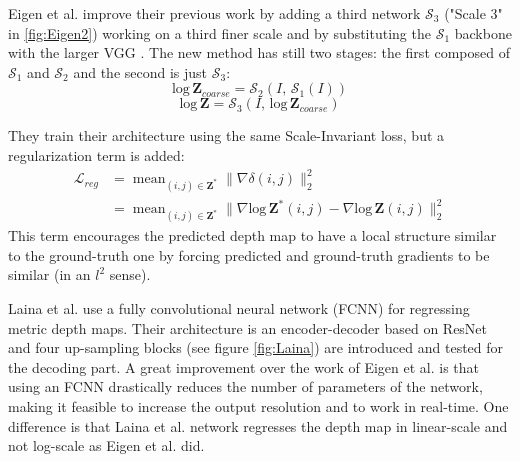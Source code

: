 Eigen et al. \cite{Eigen2} improve their previous work \cite{Eigen} by adding a third network $\mathcal{S}_{3}$ ("Scale 3" in \ref{fig:Eigen2}) working on a third finer scale and by substituting the $\mathcal{S}_{1}$ backbone with the larger VGG \cite{VGG}.
The new method has still two stages: the first composed of $\mathcal{S}_{1}$ and $\mathcal{S}_{2}$ and the second is just $\mathcal{S}_{3}$:
\[
	\text{log} \, \mathbf{Z}_{coarse} = \mathcal{S}_{2}(I, \, \mathcal{S}_{1}(I))
\]\[
	\text{log} \, \mathbf{Z} = \mathcal{S}_{3}(I, \, \text{log} \, \mathbf{Z}_{coarse})
\]

They train their architecture using the same Scale-Invariant loss, but a regularization term is added:
\begin{equation}
\begin{split}
	\mathcal{L}_{reg} & = \mathop{\text{mean}}_{(i, j) \in \mathbf{Z}^{*}}
		\big\|
			\nabla \delta(i, j)
		\big\|_{2}^{2} \\
	& = \mathop{\text{mean}}_{(i, j) \in \mathbf{Z}^{*}}
		\big\|
			\nabla \text{log} \, \mathbf{Z}^{*} (i, j) - \nabla \text{log} \, \mathbf{Z} (i, j)
		\big\|_{2}^{2}
\end{split}
\end{equation}
This term encourages the predicted depth map to have a local structure similar to the ground-truth one by forcing predicted and ground-truth gradients to be similar (in an $l^{2}$ sense).

Laina et al. \cite{Laina} use a fully convolutional neural network (FCNN) for regressing metric depth maps.
Their architecture is an encoder-decoder based on ResNet \cite{ResNet} and four up-sampling blocks (see figure \ref{fig:Laina}) are introduced and tested for the decoding part.
A great improvement over the work of Eigen et al. is that using an FCNN drastically reduces the number of parameters of the network, making it feasible to increase the output resolution and to work in real-time.
One difference is that Laina et al. network regresses the depth map in linear-scale and not log-scale as Eigen et al. did.

